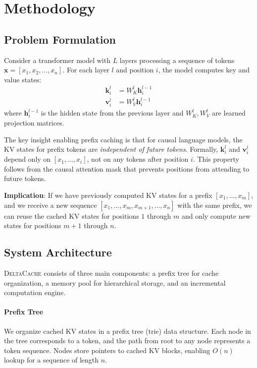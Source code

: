 \documentclass{article}
\newcommand{\deltacache}{\textsc{DeltaCache}}
\begin{document}
\section{Methodology}
\label{sec:method}

\subsection{Problem Formulation}

Consider a transformer model with $L$ layers processing a sequence of tokens $\mathbf{x} = [x_1, x_2, \ldots, x_n]$.
For each layer $l$ and position $i$, the model computes key and value states:
\begin{align}
    \mathbf{k}_i^l &= W_K^l \mathbf{h}_i^{l-1} \\
    \mathbf{v}_i^l &= W_V^l \mathbf{h}_i^{l-1}
\end{align}
where $\mathbf{h}_i^{l-1}$ is the hidden state from the previous layer and $W_K^l, W_V^l$ are learned projection matrices.

The key insight enabling prefix caching is that for causal language models, the KV states for prefix tokens are \textit{independent of future tokens}.
Formally, $\mathbf{k}_i^l$ and $\mathbf{v}_i^l$ depend only on $[x_1, \ldots, x_i]$, not on any tokens after position $i$.
This property follows from the causal attention mask that prevents positions from attending to future tokens.

\textbf{Implication}: If we have previously computed KV states for a prefix $[x_1, \ldots, x_m]$, and we receive a new sequence $[x_1, \ldots, x_m, x_{m+1}, \ldots, x_n]$ with the same prefix, we can reuse the cached KV states for positions $1$ through $m$ and only compute new states for positions $m+1$ through $n$.

\subsection{System Architecture}

\deltacache{} consists of three main components: a prefix tree for cache organization, a memory pool for hierarchical storage, and an incremental computation engine.

\paragraph{Prefix Tree}
We organize cached KV states in a prefix tree (trie) data structure.
Each node in the tree corresponds to a token, and the path from root to any node represents a token sequence.
Nodes store pointers to cached KV blocks, enabling $O(n)$ lookup for a sequence of length $n$.
\end{document}
